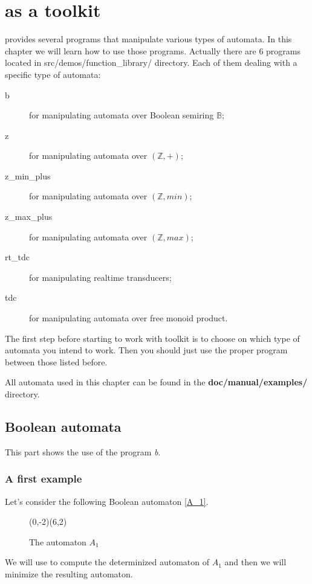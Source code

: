 \chapter{\Vauc as a toolkit}

\Vauc provides several programs that manipulate various types of
automata. In this chapter we will learn how to use those
programs. Actually there are 6 programs located in
src/demos/function\_library/ directory. Each of them dealing with a
specific type of automata:
\begin{description}
  \item [b] for manipulating automata over Boolean semiring $\mathbb{B}$;
  \item [z] for manipulating automata over $(\mathbb{Z},+)$;
  \item [z\_min\_plus] for manipulating automata over $(\mathbb{Z},min)$;
  \item [z\_max\_plus] for manipulating automata over $(\mathbb{Z},max)$;
  \item [rt\_tdc] for manipulating realtime transducers;
  \item [tdc] for manipulating automata over free monoid product.
\end{description}
The first step before starting to work with \Vauc toolkit is to choose
on which type of automata you intend to work. Then you should just use
the proper program between those listed before.

All automata used in this chapter can be found in the
\textbf{doc/manual/examples/} directory.
\newpage

\section{Boolean automata}

This part shows the use of the program \textit{b}.

\subsection{A first example}

Let's consider the following Boolean automaton \autoref{A_1}.
\begin{figure}[ht] \centering
  \begin{VCPicture}{(0,-2)(6,2)}
      
     
     
       
  \end{VCPicture}
  \caption{The automaton $A_1$}
  \label{A_1}
\end{figure}
We will use \Vauc to compute the determinized automaton of $A_1$ and
then we will minimize the resulting automaton.

